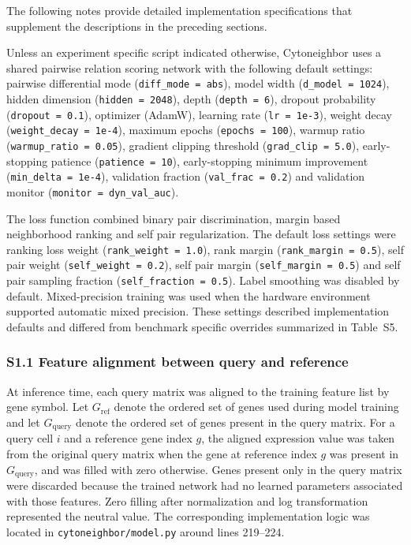 \documentclass[11pt]{article}
\begin{document}
The following notes provide detailed implementation specifications that supplement the descriptions in the preceding sections.

Unless an experiment specific script indicated otherwise, Cytoneighbor uses a shared pairwise relation scoring network with the following default settings: pairwise differential mode (\texttt{diff\_mode = abs}), model width (\texttt{d\_model = 1024}), hidden dimension (\texttt{hidden = 2048}), depth (\texttt{depth = 6}), dropout probability (\texttt{dropout = 0.1}), optimizer (AdamW), learning rate (\texttt{lr = 1e-3}), weight decay (\texttt{weight\_decay = 1e-4}), maximum epochs (\texttt{epochs = 100}), warmup ratio (\texttt{warmup\_ratio = 0.05}), gradient clipping threshold (\texttt{grad\_clip = 5.0}), early-stopping patience (\texttt{patience = 10}), early-stopping minimum improvement (\texttt{min\_delta = 1e-4}), validation fraction (\texttt{val\_frac = 0.2}) and validation monitor (\texttt{monitor = dyn\_val\_auc}).

The loss function combined binary pair discrimination, margin based neighborhood ranking and self pair regularization. The default loss settings were ranking loss weight (\texttt{rank\_weight = 1.0}), rank margin (\texttt{rank\_margin = 0.5}), self pair weight (\texttt{self\_weight = 0.2}), self pair margin (\texttt{self\_margin = 0.5}) and self pair sampling fraction (\texttt{self\_fraction = 0.5}). Label smoothing was disabled by default. Mixed-precision training was used when the hardware environment supported automatic mixed precision. These settings described implementation defaults and differed from benchmark specific overrides summarized in Table~S5.

\subsubsection*{S1.1 Feature alignment between query and reference}

At inference time, each query matrix was aligned to the training feature list by gene symbol. Let \(G_{\mathrm{ref}}\) denote the ordered set of genes used during model training and let \(G_{\mathrm{query}}\) denote the ordered set of genes present in the query matrix. For a query cell \(i\) and a reference gene index \(g\), the aligned expression value was taken from the original query matrix when the gene at reference index \(g\) was present in \(G_{\mathrm{query}}\), and was filled with zero otherwise. Genes present only in the query matrix were discarded because the trained network had no learned parameters associated with those features. Zero filling after normalization and log transformation represented the neutral value. The corresponding implementation logic was located in \texttt{cytoneighbor/model.py} around lines 219--224.
\end{document}
